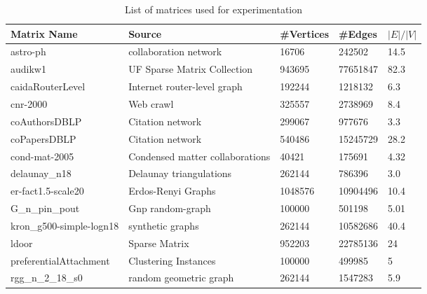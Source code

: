 \begin{table*}[ht]
\centering
\caption{List of matrices used for experimentation}
\label{tab:graphs}
\begin{tabular}{l|llll}
\toprule 
Matrix Name              & Source                          & \#Vertices & \#Edges  & $|E|/|V|$ \\
\midrule 
astro-ph                 & collaboration network           & 16706      & 242502   & 14.5      \\
audikw1                  & UF Sparse Matrix Collection     & 943695     & 77651847 & 82.3      \\
caidaRouterLevel         & Internet router-level graph     & 192244     & 1218132  & 6.3       \\
cnr-2000                 & Web crawl                       & 325557     & 2738969  & 8.4       \\
coAuthorsDBLP            & Citation network                & 299067     & 977676   & 3.3       \\
coPapersDBLP             & Citation network                & 540486     & 15245729 & 28.2      \\
cond-mat-2005            & Condensed matter collaborations & 40421      & 175691   & 4.32      \\
delaunay\_n18            & Delaunay triangulations         & 262144     & 786396   & 3.0       \\
er-fact1.5-scale20       & Erdos-Renyi Graphs              & 1048576    & 10904496 & 10.4      \\
G\_n\_pin\_pout          & Gnp random-graph                & 100000     & 501198   & 5.01      \\
kron\_g500-simple-logn18 & synthetic graphs                & 262144     & 10582686 & 40.4      \\
ldoor                    & Sparse Matrix                   & 952203     & 22785136 & 24        \\
preferentialAttachment   & Clustering Instances            & 100000     & 499985   & 5         \\
rgg\_n\_2\_18\_s0        & random geometric graph          & 262144     & 1547283  & 5.9      \\

\bottomrule 
\end{tabular}
\end{table*}
